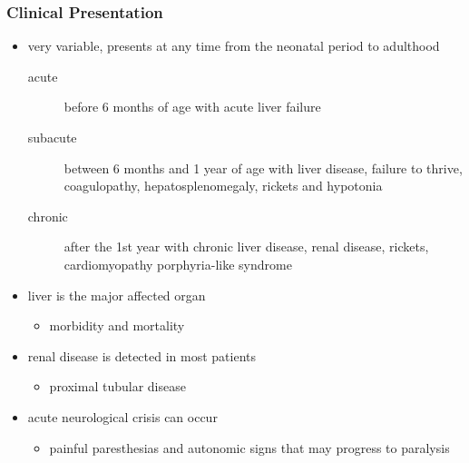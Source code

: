 \documentclass{scrartcl}
\begin{document}
\subsubsection{Clinical Presentation}
\label{sec:org1b61ce7}
\begin{itemize}
\item very variable, presents at any time from the neonatal period to adulthood
\begin{description}
\item[{acute}] before 6 months of age with acute liver failure
\item[{subacute}] between 6 months and 1 year of age with liver disease,
failure to thrive, coagulopathy, hepatosplenomegaly,
rickets and hypotonia
\item[{chronic}] after the 1st year with chronic liver disease, renal
disease, rickets, cardiomyopathy \textpm{} porphyria-like
syndrome
\end{description}

\item liver is the major affected organ
\begin{itemize}
\item morbidity and mortality
\end{itemize}
\item renal disease is detected in most patients
\begin{itemize}
\item proximal tubular disease
\end{itemize}
\item acute neurological crisis can occur
\begin{itemize}
\item painful paresthesias and autonomic signs that may progress to
paralysis
\end{itemize}
\end{itemize}
\end{document}
